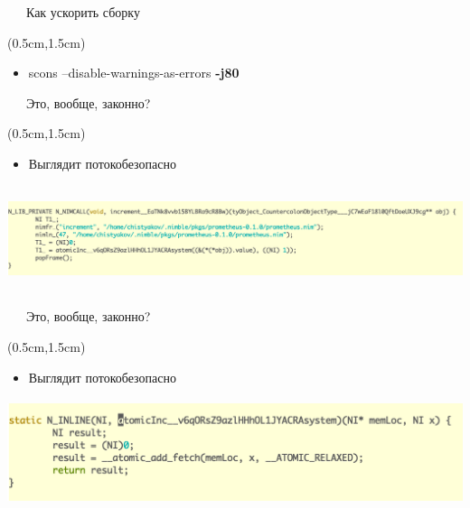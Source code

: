 \documentclass[xetex,18pt,aspectratio=43]{beamer}
\begin{document}
\begin{Large}
\begin{frame}{\ \ \ Как ускорить сборку}
\begin{textblock*}{\framewidth-0.8cm}(0.5cm,1.5cm)
\begin{itemize}
  \item scons --disable-warnings-as-errors {\bf -j80}
\end{itemize}
\end{textblock*}
\end{frame}

\begin{frame}{\ \ \ Это, вообще, законно?}
\begin{textblock*}{\framewidth-0.8cm}(0.5cm,1.5cm)
\begin{itemize}
  \item Выглядит потокобезопасно
\end{itemize}
\begin{minipage}{\textwidth}
  \centering
  \includegraphics[height=3.1cm]{img/gencode1}
\end{minipage}
\end{textblock*}
\end{frame}

\begin{frame}{\ \ \ Это, вообще, законно?}
\begin{textblock*}{\framewidth-0.8cm}(0.5cm,1.5cm)
\begin{itemize}
  \item Выглядит потокобезопасно
\end{itemize}
\begin{minipage}{\textwidth}
  \centering
  \includegraphics[height=3.1cm]{img/gencode2}
\end{minipage}
\end{textblock*}
\end{frame}


\end{Large}
\end{document}
